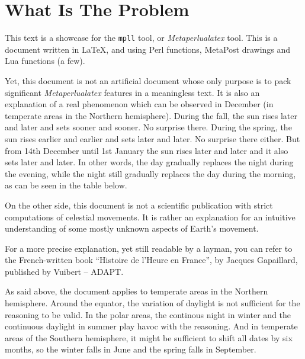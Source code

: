 \documentclass[a4paper]{article}
\newenvironment{texte}{\rmfamily}{}
\begin{document}
\begin{texte}


\section{What Is The Problem}

This text is a showcase for the \texttt{mpll} tool, or
\textit{Metaperlualatex} tool. This is a document written in \LaTeX,
and using Perl functions, MetaPost drawings
and Lua functions (a few).

Yet, this document is not an artificial document whose
only purpose is to pack significant \textit{Metaperlualatex} features in a
meaningless text. It is also an explanation 
of a real phenomenon which can be observed
in December (in temperate areas in the Northern hemisphere).
During the fall, the sun rises later and later
and sets sooner and sooner. No surprise there.
During the spring, the sun rises earlier and earlier
and sets later and later.
No surprise there either. But from
14th December until 1st January
the sun rises later and later and it also sets later 
and later. In other words, the day gradually replaces
the night during the evening, while the night
still gradually replaces the day during the morning,
as can be seen in the table below.

\vspace{2mm}
\vspace{2mm}

On the other side, this document is not a scientific publication
with strict computations of celestial movements.
It is rather an explanation for an intuitive
understanding of some mostly unknown aspects
of Earth's movement.

For a more precise explanation, yet still readable by a layman,
you can refer to the French-written book
``Histoire de l'Heure en France'', by Jacques Gapaillard, 
published by Vuibert -- ADAPT.

As said above, the document applies to temperate areas in
the Northern hemisphere. Around the equator, the variation 
of daylight is not sufficient for the reasoning to be valid.
In the polar areas, the continous night in winter and the continuous
daylight in summer play havoc with the reasoning. And in temperate
areas of the Southern hemisphere, it might be sufficient to
shift all dates by six months, so the winter falls in June and the
spring falls in September.


\end{texte}
\end{document}
